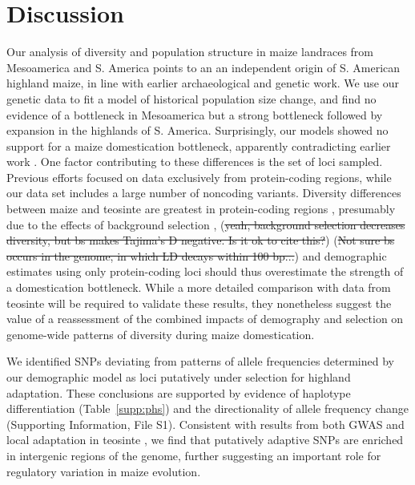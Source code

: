  \section*{Discussion}

Our analysis of diversity and population structure in maize landraces from Mesoamerica and S. America points to an  an independent origin of S. American highland maize, in line with earlier archaeological \cite[]{Piperno_2006_69,Perry_2006_16511492,Grobman_2012_22307642} and genetic \citep{vanHeerwaarden_2011_21189301} work. 
We use our genetic data to fit a model of historical population size change, and find no evidence of a bottleneck in Mesoamerica but a strong bottleneck followed by expansion in the highlands of S. America. 
Surprisingly, our models showed no support for a maize domestication bottleneck, apparently contradicting earlier work \cite[]{Eyre-Walker_1998_9539756,Tenaillon_2004_15014173,Wright_2005_15919994}. 
One factor contributing to these differences is the set of loci sampled. 
Previous efforts focused on data exclusively from protein-coding regions, while our data set includes a large number of noncoding variants.
Diversity differences between maize and teosinte are greatest in protein-coding regions \citep{Hufford_2012_22660546}, presumably due to the effects of background selection \citep{Charlesworth_1993_8375663},
(\st{yeah, background selection decreases diversity, but bs makes Tajima's D negative. Is it ok to cite this?}) 
(\st{Not sure bs occurs in the genome, in which LD decays within 100 bp...}) 
and demographic estimates using only protein-coding loci should thus overestimate the strength of a domestication bottleneck.
While a more detailed comparison with data from teosinte will be required to validate these results, they nonetheless suggest the value of a reassessment of the combined impacts of demography and selection on genome-wide patterns of diversity during maize domestication.

We identified SNPs deviating from patterns of allele frequencies determined by our demographic model as loci putatively under selection for highland adaptation.
These conclusions are supported by evidence of haplotype differentiation (Table~\ref{supp:phs}) and the directionality of allele frequency change (Supporting Information, File S1).
Consistent with results from both GWAS \citep{Wallace_2014_25474422} and local adaptation in teosinte \citep{Pyhajarvi2013}, we find that putatively adaptive SNPs are enriched in intergenic regions of the genome, further suggesting an important role for regulatory variation in maize evolution. 


